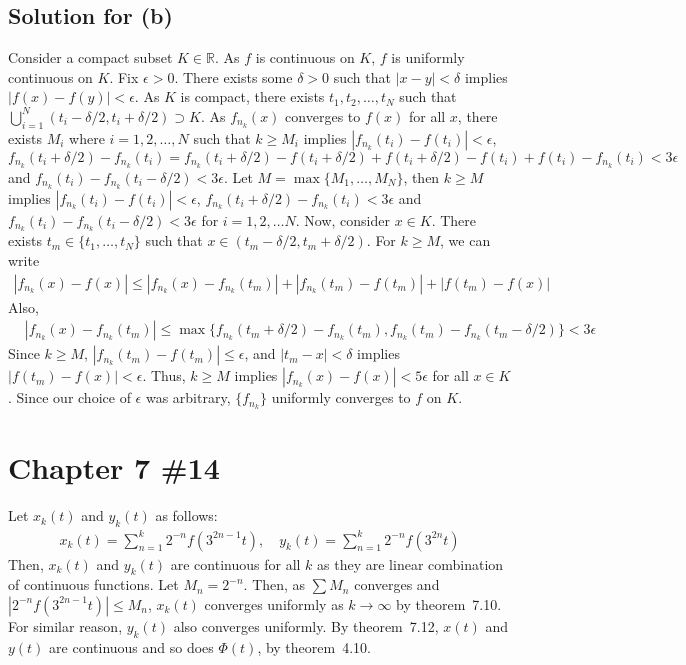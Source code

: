 \documentclass{scrartcl}
\begin{document}
\subsection{Solution for (b)}
Consider a compact subset \(K \in \mathbb{R}\). As \(f\) is continuous on
\(K\), \(f\) is uniformly continuous on \(K\). Fix \(\epsilon > 0\). There
exists some \(\delta > 0\) such that \(|x - y| < \delta\) implies \(|f(x) -
f(y)| < \epsilon\). As \(K\) is compact, there exists \(t_1, t_2, \dots, t_N\)
such that \(\bigcup^N_{i = 1} (t_i - \delta / 2, t_i + \delta / 2) \supset
K\). As \(f_{n_k}(x)\) converges to \(f(x)\) for all \(x\), there exists
\(M_i\) where \(i = 1, 2, \dots, N\) such that \(k \ge M_i\) implies
\(|f_{n_k}(t_i) - f(t_i)| < \epsilon\), \(f_{n_k}(t_i + \delta / 2) -
f_{n_k}(t_i) = f_{n_k}(t_i + \delta / 2) - f(t_i + \delta / 2) + f(t_i + \delta
/ 2) - f(t_i) + f(t_i) - f_{n_k}(t_i) < 3\epsilon\) and \(f_{n_k}(t_i) -
f_{n_k}(t_i - \delta / 2) < 3\epsilon\). Let \(M = \max \{M_1, \dots, M_N\}\),
then \(k \ge M\) implies \(|f_{n_k}(t_i) - f(t_i)| < \epsilon\), \(f_{n_k}(t_i
+ \delta / 2) - f_{n_k}(t_i) < 3\epsilon\) and \(f_{n_k}(t_i) - f_{n_k}(t_i -
\delta / 2) < 3\epsilon\) for \(i = 1, 2,
\dots N\). Now, consider \(x \in K\). There exists \(t_m \in \{t_1, \dots,
t_N\}\) such that \(x \in (t_m - \delta / 2, t_m + \delta / 2)\). For \(k \ge
M\), we can write
\begin{align*}
  |f_{n_k}(x) - f(x)|
  \le |f_{n_k}(x) - f_{n_k}(t_m)| + |f_{n_k}(t_m) - f(t_m)|
    + |f(t_m) - f(x)|
\end{align*}
Also,
\begin{align*}
  &|f_{n_k}(x) - f_{n_k}(t_m)|
  \le \max\{f_{n_k}(t_m + \delta / 2) - f_{n_k}(t_m),
    f_{n_k}(t_m) - f_{n_k}(t_m - \delta / 2)\}
  < 3\epsilon
\end{align*}
Since \(k \ge M\), \(|f_{n_k}(t_m) - f(t_m)| \le \epsilon\), and \(|t_m - x| <
\delta\) implies \(|f(t_m) - f(x)| < \epsilon\). Thus, \(k \ge M\) implies
\(|f_{n_k}(x) - f(x)| < 5\epsilon\) for all \(x \in K\). Since our choice of
\(\epsilon\) was arbitrary, \(\{f_{n_k}\}\) uniformly converges to \(f\) on
\(K\).

\section{Chapter 7 \#14}
Let \(x_k(t)\) and \(y_k(t)\) as follows:
\begin{align*}
  x_k(t) = \sum^k_{n = 1} 2^{-n} f(3^{2n - 1} t), \quad
  y_k(t) = \sum^k_{n = 1} 2^{-n} f(3^{2n} t)
\end{align*}
Then, \(x_k(t)\) and \(y_k(t)\) are continuous for all \(k\) as they are linear
combination of continuous functions. Let \(M_n = 2^{-n}\). Then, as \(\sum
M_n\) converges and \(|2^{-n} f(3^{2n - 1} t)| \le M_n\), \(x_k(t)\) converges
uniformly as \(k \to \infty\) by theorem~7.10. For similar reason, \(y_k(t)\)
also converges uniformly. By theorem~7.12, \(x(t)\) and \(y(t)\) are continuous
and so does \(\Phi(t)\), by theorem~4.10.
\end{document}
